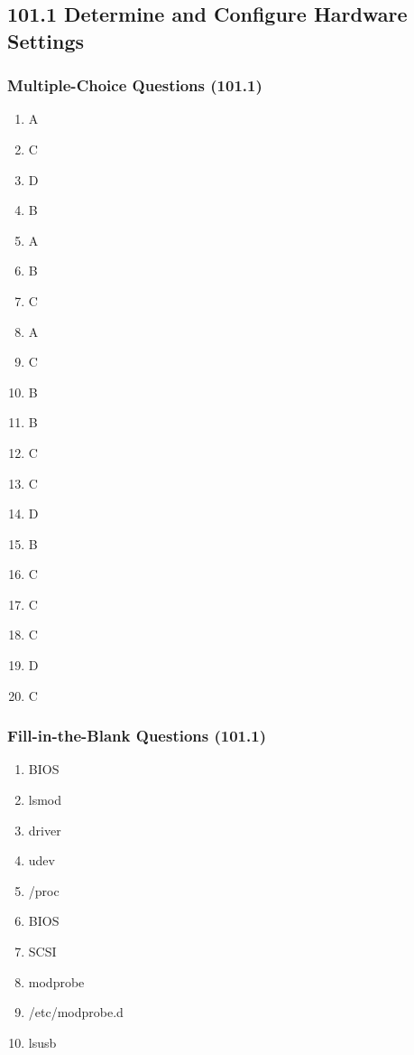 \documentclass[a4paper]{report}
\begin{document}
\subsection*{101.1 Determine and Configure Hardware Settings}
\subsubsection*{Multiple-Choice Questions (101.1)}
\begin{enumerate}[1.]
    \item A
    \item C
    \item D
    \item B
    \item A
    \item B
    \item C
    \item A
    \item C
    \item B
    \item B
    \item C
    \item C
    \item D
    \item B
    \item C
    \item C
    \item C
    \item D
    \item C
    \end{enumerate}




\subsubsection*{Fill-in-the-Blank Questions (101.1)}
\begin{enumerate}[1.]
    \item BIOS
    \item lsmod
    \item driver
    \item udev
    \item /proc
    \item BIOS
    \item SCSI
    \item modprobe
    \item /etc/modprobe.d
    \item lsusb
    \end{enumerate}
\end{document}
